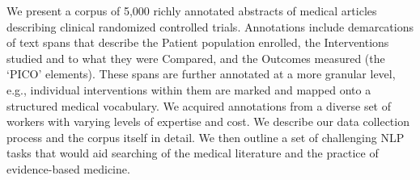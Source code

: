 We present a corpus of 5,000 richly annotated abstracts of medical articles describing clinical randomized controlled trials. Annotations include demarcations of text spans that describe the Patient population enrolled, the Interventions studied and to what they were Compared, and the Outcomes measured (the `PICO' elements). These spans are further annotated at a more granular level, e.g., individual interventions within them are marked and mapped onto a structured medical vocabulary. We acquired annotations from a diverse set of workers with varying levels of expertise and cost. We describe our data collection process and the corpus itself in detail. We then outline a set of challenging NLP tasks that would aid searching of the medical literature and the practice of evidence-based medicine.
